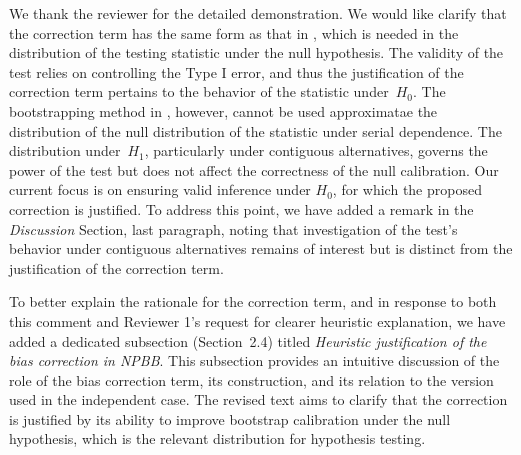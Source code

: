 \documentclass[12pt]{article}
\begin{document}
We thank the reviewer for the detailed demonstration. We would like
clarify that the correction term has the same form as that in
\citet{babu2004goodness}, which is needed in the distribution of the
testing statistic under the null hypothesis. The validity of the test
relies on controlling the Type I error, and thus the justification of
the correction term pertains to the behavior of the statistic
under~$H_0$. The bootstrapping method in \citet{babu2004goodness},
however, cannot be used approximatae the distribution of the null
distribution of the statistic under serial dependence. The
distribution under~$H_1$, particularly under contiguous alternatives,
governs the power of the test but does not affect the correctness of
the null calibration. Our current focus is on ensuring valid inference
under $H_0$, for which the proposed correction is justified. To
address this point, we have added a remark in the \emph{Discussion}
Section, last paragraph, noting that investigation of the test’s
behavior under contiguous alternatives remains of interest but is
distinct from the justification of the correction term.


To better explain the rationale for the correction term, and in response to both 
this comment and Reviewer 1’s request for clearer heuristic explanation, we have 
added a dedicated subsection (Section~2.4) titled \emph{Heuristic justification 
of the bias correction in NPBB}. This subsection provides an intuitive discussion 
of the role of the bias correction term, its construction, and its relation to 
the version used in the independent case. The revised text aims to clarify that 
the correction is justified by its ability to improve bootstrap calibration under 
the null hypothesis, which is the relevant distribution for hypothesis testing.




\end{document}

